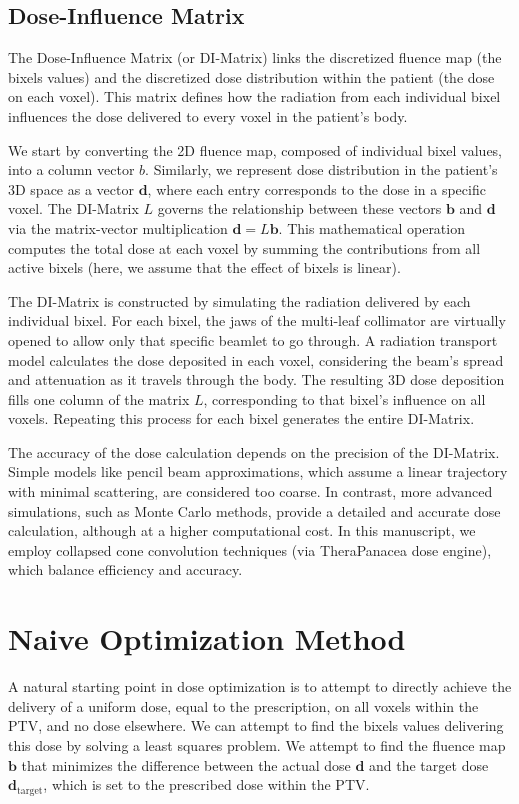 \subsection[DI-Matrix]{Dose-Influence Matrix}
The Dose-Influence Matrix (or DI-Matrix) links the discretized fluence map (the bixels values) and the discretized dose distribution within the patient (the dose on each voxel).
This matrix defines how the radiation from each individual bixel influences the dose delivered to every voxel in the patient's body.

We start by converting the 2D fluence map, composed of individual bixel values, into a column vector $b$.
Similarly, we represent dose distribution in the patient's 3D space as a vector $\mathbf{d}$, where each entry corresponds to the dose in a specific voxel.
The DI-Matrix $L$ governs the relationship between these vectors $\mathbf{b}$ and $\mathbf{d}$ via the matrix-vector multiplication $\mathbf{d} = L\mathbf{b}$.
This mathematical operation computes the total dose at each voxel by summing the contributions from all active bixels (here, we assume that the effect of bixels is linear).

The DI-Matrix is constructed by simulating the radiation delivered by each individual bixel.
For each bixel, the jaws of the multi-leaf collimator are virtually opened to allow only that specific beamlet to go through.
A radiation transport model calculates the dose deposited in each voxel, considering the beam's spread and attenuation as it travels through the body.
The resulting 3D dose deposition fills one column of the matrix $L$, corresponding to that bixel's influence on all voxels.
Repeating this process for each bixel generates the entire DI-Matrix.

The accuracy of the dose calculation depends on the precision of the DI-Matrix.
Simple models like pencil beam approximations, which assume a linear trajectory with minimal scattering, are considered too coarse.
In contrast, more advanced simulations, such as Monte Carlo methods, provide a detailed and accurate dose calculation, although at a higher computational cost.
In this manuscript, we employ collapsed cone convolution techniques (via TheraPanacea dose engine), which balance efficiency and accuracy.

\section{Naive Optimization Method}
\label{naive_optimization}
A natural starting point in dose optimization is to attempt to directly achieve the delivery of a uniform dose, equal to the prescription, on all voxels within the PTV, and no dose elsewhere.
We can attempt to find the bixels values delivering this dose by solving a least squares problem.
We attempt to find the fluence map $\mathbf{b}$ that minimizes the difference between the actual dose $\mathbf{d}$ and the target dose $\mathbf{d}_{\text{target}}$, which is set to the prescribed dose within the PTV.

